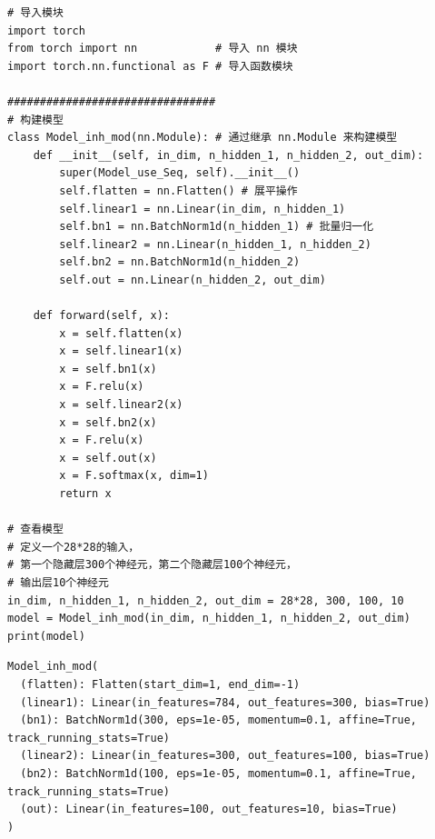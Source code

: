 \begin{lstlisting}[style=pythonstyle]
# 导入模块
import torch
from torch import nn            # 导入 nn 模块
import torch.nn.functional as F # 导入函数模块

################################
# 构建模型
class Model_inh_mod(nn.Module): # 通过继承 nn.Module 来构建模型
    def __init__(self, in_dim, n_hidden_1, n_hidden_2, out_dim):
        super(Model_use_Seq, self).__init__()
        self.flatten = nn.Flatten() # 展平操作
        self.linear1 = nn.Linear(in_dim, n_hidden_1)
        self.bn1 = nn.BatchNorm1d(n_hidden_1) # 批量归一化
        self.linear2 = nn.Linear(n_hidden_1, n_hidden_2)
        self.bn2 = nn.BatchNorm1d(n_hidden_2)
        self.out = nn.Linear(n_hidden_2, out_dim)

    def forward(self, x):
        x = self.flatten(x)
        x = self.linear1(x)
        x = self.bn1(x)
        x = F.relu(x)
        x = self.linear2(x)
        x = self.bn2(x)
        x = F.relu(x)
        x = self.out(x)
        x = F.softmax(x, dim=1)
        return x

# 查看模型    
# 定义一个28*28的输入，
# 第一个隐藏层300个神经元，第二个隐藏层100个神经元，
# 输出层10个神经元
in_dim, n_hidden_1, n_hidden_2, out_dim = 28*28, 300, 100, 10
model = Model_inh_mod(in_dim, n_hidden_1, n_hidden_2, out_dim)
print(model)
\end{lstlisting}
\begin{lstlisting}[style=demostyle,numbers=none]
Model_inh_mod(
  (flatten): Flatten(start_dim=1, end_dim=-1)
  (linear1): Linear(in_features=784, out_features=300, bias=True)
  (bn1): BatchNorm1d(300, eps=1e-05, momentum=0.1, affine=True, track_running_stats=True)
  (linear2): Linear(in_features=300, out_features=100, bias=True)
  (bn2): BatchNorm1d(100, eps=1e-05, momentum=0.1, affine=True, track_running_stats=True)
  (out): Linear(in_features=100, out_features=10, bias=True)
)    
\end{lstlisting}


